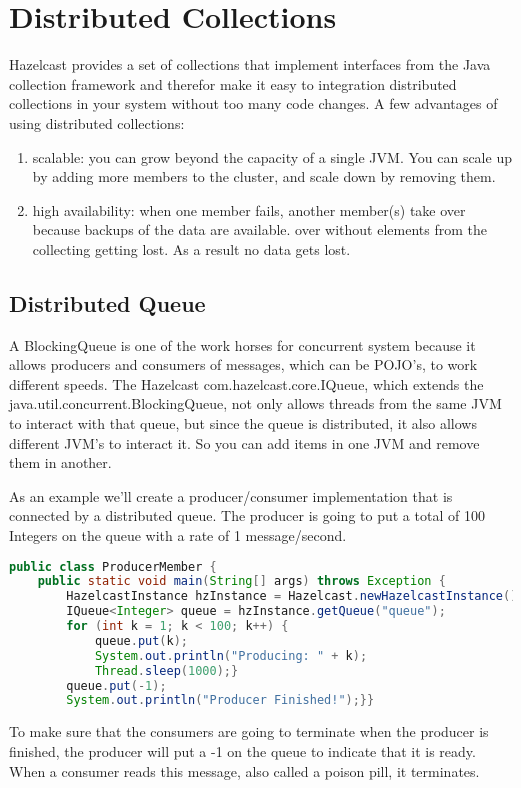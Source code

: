 \chapter{Distributed Collections}
Hazelcast provides a set of collections that implement interfaces from the Java collection framework and therefor make it easy to integration distributed collections in your system without too many code changes. A few advantages of using distributed collections:
\begin{enumerate}
\item scalable: you can grow beyond the capacity of a single JVM. You can scale up by adding more members to the cluster, and scale down by removing them.
\item high availability: when one member fails, another member(s) take over because backups of the data are available. over without elements from the collecting getting lost. As a result no data gets lost.
\end{enumerate}

\section{Distributed Queue}
A BlockingQueue is one of the work horses for concurrent system because it allows producers and consumers of messages, which can be POJO's, to work different speeds. The Hazelcast com.hazelcast.core.IQueue, which extends the java.util.concurrent.BlockingQueue, not only allows threads from the same JVM to interact with that queue, but since the queue is distributed, it also allows different JVM's to interact it. So you can add items in one JVM and remove them in another.

As an example we'll create a producer/consumer implementation that is connected by a distributed queue. The producer is going to put a total of 100 Integers on the queue with a rate of 1 message/second.
\begin{lstlisting}[language=java]
public class ProducerMember {
    public static void main(String[] args) throws Exception {
        HazelcastInstance hzInstance = Hazelcast.newHazelcastInstance();
        IQueue<Integer> queue = hzInstance.getQueue("queue");
        for (int k = 1; k < 100; k++) {
            queue.put(k);
            System.out.println("Producing: " + k);
            Thread.sleep(1000);}
        queue.put(-1);
        System.out.println("Producer Finished!");}}
\end{lstlisting}
To make sure that the consumers are going to terminate when the producer is finished, the producer will put a -1 on the queue to indicate that it is ready. When a consumer reads this message, also called a poison pill, it terminates. 

